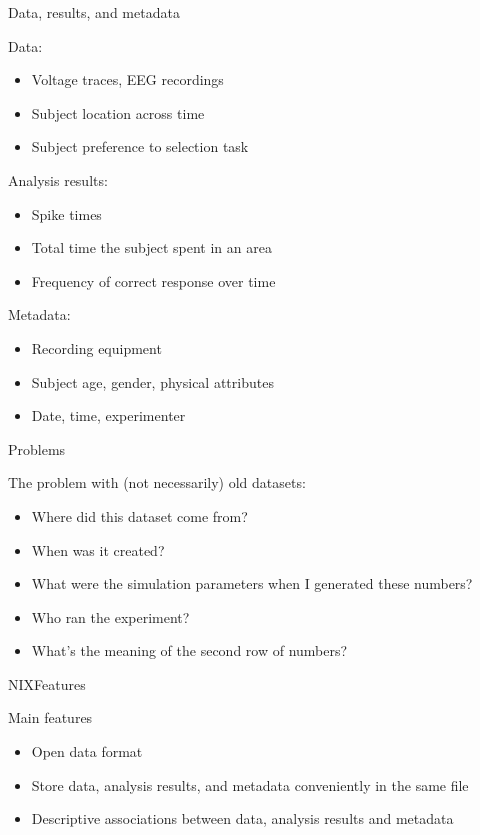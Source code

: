 \documentclass[10pt]{beamer}
\begin{document}
\begin{frame}{Data, results, and metadata}

    Data:
    \begin{itemize}
        \item Voltage traces, EEG recordings
        \item Subject location across time
        \item Subject preference to selection task
    \end{itemize}

    Analysis results:
    \begin{itemize}
        \item Spike times
        \item Total time the subject spent in an area
        \item Frequency of correct response over time
    \end{itemize}

    \pause{}

    Metadata:
    \begin{itemize}
        \item Recording equipment
        \item Subject age, gender, physical attributes
        \item Date, time, experimenter
    \end{itemize}

\end{frame}

\begin{frame}{Problems}

    The problem with (not necessarily) old datasets:
    \begin{itemize}
        \item Where did this dataset come from?
        \item When was it created?
        \item What were the simulation parameters when I generated these numbers?
        \item Who ran the experiment?
        \item What's the meaning of the second row of numbers?
    \end{itemize}
\end{frame}

\begin{frame}{NIX}{Features}

    Main features
    \begin{itemize}
        \item Open data format
        \item Store data, analysis results, and metadata conveniently in the same file
        \item Descriptive associations between data, analysis results and metadata
    \end{itemize}
\end{frame}
\end{document}
